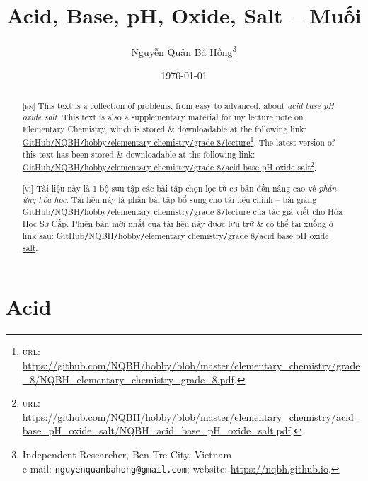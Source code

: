 \documentclass{article}
\title{Acid, Base, pH, Oxide, Salt -- Muối}
\author{Nguyễn Quản Bá Hồng\footnote{Independent Researcher, Ben Tre City, Vietnam\\e-mail: \texttt{nguyenquanbahong@gmail.com}; website: \url{https://nqbh.github.io}.}}
\date{\today}
\begin{document}
\maketitle
\begin{abstract}
	\textsc{[en]} This text is a collection of problems, from easy to advanced, about \textit{acid base pH oxide salt}. This text is also a supplementary material for my lecture note on Elementary Chemistry, which is stored \& downloadable at the following link: \href{https://github.com/NQBH/hobby/blob/master/elementary_chemistry/grade_8/NQBH_elementary_chemistry_grade_8.pdf}{GitHub\texttt{/}NQBH\texttt{/}hobby\texttt{/}elementary chemistry\texttt{/}grade 8\texttt{/}lecture}\footnote{\textsc{url}: \url{https://github.com/NQBH/hobby/blob/master/elementary_chemistry/grade_8/NQBH_elementary_chemistry_grade_8.pdf}.}. The latest version of this text has been stored \& downloadable at the following link: \href{https://github.com/NQBH/hobby/blob/master/elementary_chemistry/acid_base_pH_oxide_salt/NQBH_acid_base_pH_oxide_salt.pdf}{GitHub\texttt{/}NQBH\texttt{/}hobby\texttt{/}elementary chemistry\texttt{/}grade 8\texttt{/}acid base pH oxide salt}\footnote{\textsc{url}: \url{https://github.com/NQBH/hobby/blob/master/elementary_chemistry/acid_base_pH_oxide_salt/NQBH_acid_base_pH_oxide_salt.pdf}.}.
	\vspace{2mm}
	
	\textsc{[vi]} Tài liệu này là 1 bộ sưu tập các bài tập chọn lọc từ cơ bản đến nâng cao về \textit{phản ứng hóa học}. Tài liệu này là phần bài tập bổ sung cho tài liệu chính -- bài giảng \href{https://github.com/NQBH/hobby/blob/master/elementary_chemistry/grade_8/NQBH_elementary_chemistry_grade_8.pdf}{GitHub\texttt{/}NQBH\texttt{/}hobby\texttt{/}elementary chemistry\texttt{/}grade 8\texttt{/}lecture} của tác giả viết cho Hóa Học Sơ Cấp. Phiên bản mới nhất của tài liệu này được lưu trữ \& có thể tải xuống ở link sau: \href{https://github.com/NQBH/hobby/blob/master/elementary_chemistry/grade_8/real/NQBH_real.pdf}{GitHub\texttt{/}NQBH\texttt{/}hobby\texttt{/}elementary chemistry\texttt{/}grade 8\texttt{/}acid base pH oxide salt}.
\end{abstract}
\setcounter{secnumdepth}{4}
\setcounter{tocdepth}{3}
\tableofcontents
\newpage


\section{Acid}
\end{document}
